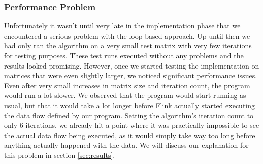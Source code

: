 
\subsubsection{Performance Problem}
\label{ssec:loop_performance_problem}

Unfortunately it wasn't until very late in the implementation phase that we
encountered a serious problem with the loop-based approach. Up until then we
had only ran the algorithm on a very small test matrix with very few
iterations for testing purposes. These test runs executed without any problems
and the results looked promising. However, once we started testing the
implementation on matrices that were even slightly larger, we noticed
significant performance issues. Even after very small increases in matrix size
and iteration count, the program would run a lot slower. We observed that the
program would start running as usual, but that it would take a lot longer
before Flink actually started executing the data flow defined by our program.
Setting the algorithm's iteration count to only 6 iterations, we already hit a
point where it was practically impossible to see the actual data flow being
executed, as it would simply take way too long before anything actually
happened with the data. We will discuss our explanation for this problem in
section \ref{sec:results}.


